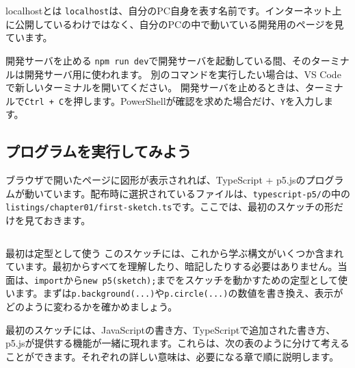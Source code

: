\begin{pointbox}{localhostとは}
\texttt{localhost}は、自分のPC自身を表す名前です。インターネット上に公開しているわけではなく、自分のPCの中で動いている開発用のページを見ています。
\end{pointbox}

\begin{notebox}{開発サーバを止める}
\texttt{npm run dev}で開発サーバを起動している間、そのターミナルは開発サーバ用に使われます。
別のコマンドを実行したい場合は、VS Codeで新しいターミナルを開いてください。
開発サーバを止めるときは、ターミナルで\texttt{Ctrl + C}を押します。PowerShellが確認を求めた場合だけ、\texttt{Y}を入力します。
\end{notebox}

\subsection{プログラムを実行してみよう}

ブラウザで開いたページに図形が表示されれば、TypeScript + p5.jsのプログラムが動いています。配布時に選択されているファイルは、\texttt{typescript-p5/}の中の\texttt{listings/chapter01/first-sketch.ts}です。ここでは、最初のスケッチの形だけを見ておきます。


\begin{listing}[htbp]
\inputminted{ts}{typescript-p5/listings/chapter01/first-sketch.ts}
\caption{最初のp5.jsスケッチ（\texttt{chapter01/first-sketch.ts}）}
\label{lst:chapter01-first-sketch}
\end{listing}

\begin{pointbox}{最初は定型として使う}
このスケッチには、これから学ぶ構文がいくつか含まれています。最初からすべてを理解したり、暗記したりする必要はありません。当面は、\texttt{import}から\texttt{new p5(sketch);}までをスケッチを動かすための定型として使います。まずは\texttt{p.background(...)}や\texttt{p.circle(...)}の数値を書き換え、表示がどのように変わるかを確かめましょう。
\end{pointbox}

最初のスケッチには、JavaScriptの書き方、TypeScriptで追加された書き方、p5.jsが提供する機能が一緒に現れます。これらは、次の表のように分けて考えることができます。それぞれの詳しい意味は、必要になる章で順に説明します。

